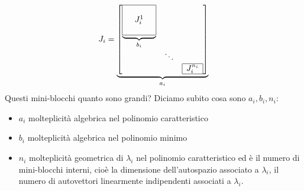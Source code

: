 \documentclass[10pt,a4paper]{book}
\begin{document}
\begin{equation*}
J_{i} =\underbrace{\begin{bmatrix}
\underbrace{\begin{array}{|c c c|}
\hline
 &  & \\
 & J^{1}_{i} & \\
 &  & \\
\hline
\end{array}}_{b_{i}} &  & \\
 & \ddots  & \\
 &  & \begin{array}{|c|}
\hline
J^{n_{i}}_{i}\\
\hline
\end{array}
\end{bmatrix}}_{a_{i}}
\end{equation*}
Questi mini-blocchi quanto sono grandi? Diciamo subito cosa sono $a_{i} ,b_{i} ,n_{i}$:
\begin{itemize}
\item $a_{i}$ molteplicità algebrica nel polinomio caratteristico
\item $b_{i}$ molteplicità algebrica nel polinomio minimo
\item $n_{i}$ molteplicità geometrica di $\lambda _{i}$ nel polinomio caratteristico ed è il numero di mini-blocchi interni, cioè la dimensione dell'autospazio associato a $\lambda _{i}$, il numero di autovettori linearmente indipendenti associati a $\lambda _{i}$.
\end{itemize}
\end{document}
